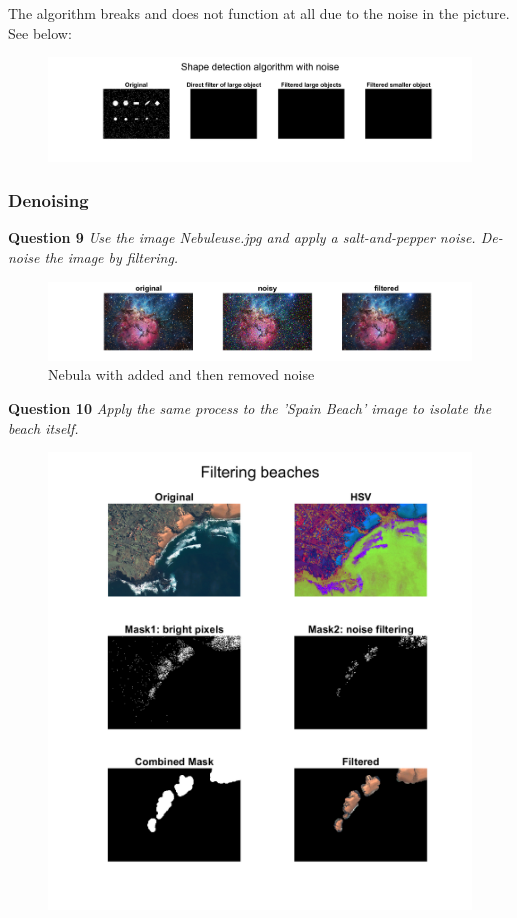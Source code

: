 The algorithm breaks and does not function at all due to the noise in the picture. See below:

\begin{figure}[H]
    \centering
    \includegraphics[width=\linewidth]{Doc/Graphics/Part2/part2_Q8.png}
\end{figure}


\subsubsection{Denoising}
\textbf{Question 9} \textit{Use the image Nebuleuse.jpg and apply a salt-and-pepper noise. De-noise the image by ﬁltering.}

\begin{figure}[H]
    \centering
    \includegraphics[width=\linewidth]{Doc/Graphics/Part2/part2_Q9.png}
    \caption{Nebula with added and then removed noise}
\end{figure}

\textbf{Question 10} \textit{Apply the same process to the ’Spain Beach’ image to isolate the beach itself.}

\begin{figure}[H]
    \centering
    \includegraphics[width=0.5\linewidth]{Doc/Graphics/Part2/part2_Q10.png}
\end{figure}

